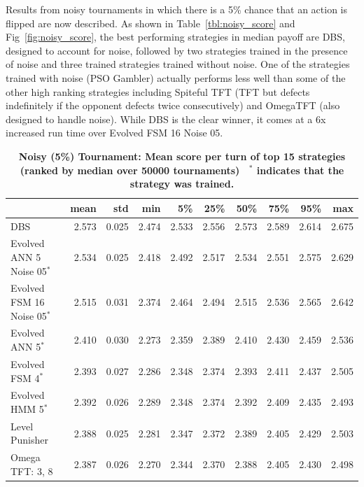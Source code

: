 \documentclass[10pt,letterpaper]{article}
\begin{document}
Results from noisy tournaments in which there is a 5\% chance that an action is
flipped are now described. As shown in Table~\ref{tbl:noisy_score} and
Fig~\ref{fig:noisy_score}, the best performing strategies in median payoff
are DBS, designed to account for noise, followed by two strategies trained in
the presence of noise and three trained strategies trained without noise. One of
the strategies trained with noise (PSO Gambler) actually performs less well than
some of the other high ranking strategies including
Spiteful TFT (TFT but defects indefinitely if the opponent defects twice
consecutively) and OmegaTFT (also designed to handle noise). While DBS is the clear
winner, it comes at a 6x increased run time over Evolved FSM 16 Noise 05.

\begin{table}[!hbtp]
    \centering
        \caption{\bf Noisy (5\%) Tournament: Mean score per turn of top 15 strategies
        (ranked by median over 50000 tournaments)
        ~$^{*}$ indicates that the strategy was trained.}
        \footnotesize
        \begin{tabular}{lrrrrrrrrr}
        \toprule
        {} &   mean &    std &    min &     5\% &    25\% &    50\% &    75\% &    95\% &    max \\
        \midrule
        DBS                              &  2.573 &  0.025 &  2.474 &  2.533 &  2.556 &  2.573 &  2.589 &  2.614 &  2.675 \\
        Evolved ANN 5 Noise 05$^{*}$     &  2.534 &  0.025 &  2.418 &  2.492 &  2.517 &  2.534 &  2.551 &  2.575 &  2.629 \\
        Evolved FSM 16 Noise 05$^{*}$    &  2.515 &  0.031 &  2.374 &  2.464 &  2.494 &  2.515 &  2.536 &  2.565 &  2.642 \\
        Evolved ANN 5$^{*}$              &  2.410 &  0.030 &  2.273 &  2.359 &  2.389 &  2.410 &  2.430 &  2.459 &  2.536 \\
        Evolved FSM 4$^{*}$              &  2.393 &  0.027 &  2.286 &  2.348 &  2.374 &  2.393 &  2.411 &  2.437 &  2.505 \\
        Evolved HMM 5$^{*}$              &  2.392 &  0.026 &  2.289 &  2.348 &  2.374 &  2.392 &  2.409 &  2.435 &  2.493 \\
        Level Punisher                   &  2.388 &  0.025 &  2.281 &  2.347 &  2.372 &  2.389 &  2.405 &  2.429 &  2.503 \\
        Omega TFT: 3, 8                  &  2.387 &  0.026 &  2.270 &  2.344 &  2.370 &  2.388 &  2.405 &  2.430 &  2.498 \\

\end{tabular}
\end{table}
\end{document}
